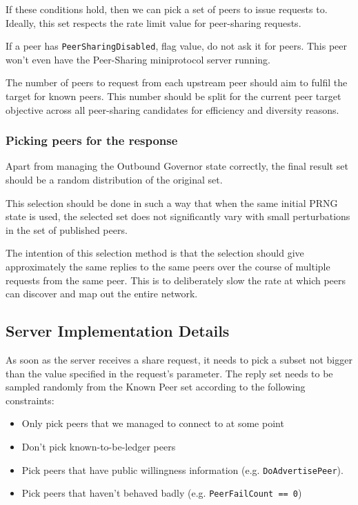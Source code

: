 If these conditions hold, then we can pick a set of peers to issue requests to.
Ideally, this set respects the rate limit value for peer-sharing requests.

If a peer has \texttt{PeerSharingDisabled}, flag value, do not ask it for peers.
This peer won't even have the Peer-Sharing miniprotocol server running.

The number of peers to request from each upstream peer should aim to fulfil
the target for known peers. This number should be split for the current peer
target objective across all peer-sharing candidates for efficiency and
diversity reasons.

\subsubsection{Picking peers for the response}

Apart from managing the Outbound Governor state correctly, the final result
set should be a random distribution of the original set.

This selection should be done in such a way that when the same initial PRNG
state is used, the selected set does not significantly vary with small
perturbations in the set of published peers.

The intention of this selection method is that the selection should give
approximately the same replies to the same peers over the course of multiple
requests from the same peer. This is to deliberately slow the rate at which
peers can discover and map out the entire network.

\subsection{Server Implementation Details}

As soon as the server receives a share request, it needs to pick a subset not bigger than the
value specified in the request's parameter. The reply set needs to be sampled randomly
from the Known Peer set according to the following constraints:

\begin{itemize}
  \item Only pick peers that we managed to connect to at some point
  \item Don't pick known-to-be-ledger peers
  \item Pick peers that have public willingness information (e.g. \texttt{DoAdvertisePeer}).
  \item Pick peers that haven't behaved badly (e.g. \texttt{PeerFailCount == 0})
\end{itemize}


